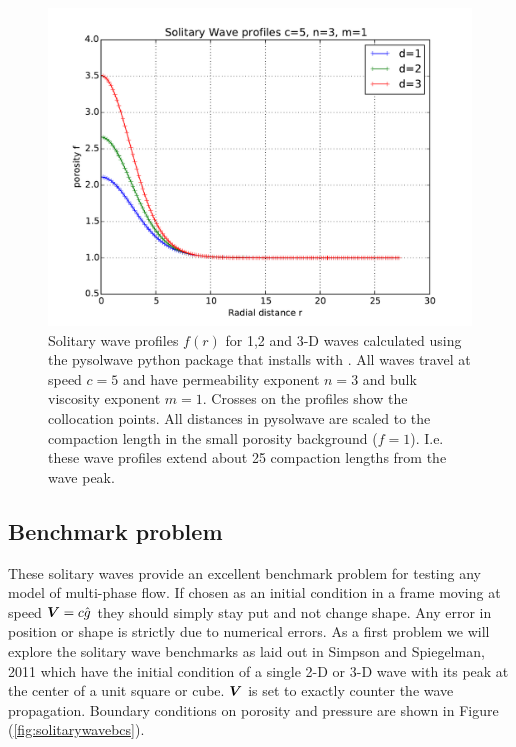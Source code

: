 \begin{figure}[htbp!]
  \centering
  \includegraphics[width=.75\textwidth]{figures/SolitaryWavesProfiles.pdf}
  \caption{Solitary wave profiles $f(r)$ for 1,2 and 3-D waves
    calculated using the pysolwave python package that installs with
    \TF.  All waves travel at speed $c=5$ and have permeability
    exponent $n=3$ and bulk viscosity exponent $m=1$.  Crosses on the
    profiles show the collocation points. All distances in pysolwave
    are scaled to the compaction length in the small porosity
    background ($f=1$).  I.e. these wave profiles extend about 25
    compaction lengths from the wave peak.}
\label{fig:SolitaryWaveProfiles}
 \end{figure}

\subsection{Benchmark problem}
\label{sec:benchmark-problem}

These solitary waves provide an excellent benchmark problem for
testing any model of multi-phase flow.  If chosen as an initial
condition in a frame moving at speed ${\mbox{\boldmath$V$}} = c\hat{g}$ they should
simply stay put and not change shape.  Any error in position or shape
is strictly due to numerical errors.  As a first problem we will
explore the solitary wave benchmarks as laid out in Simpson and
Spiegelman, 2011 \cite{simpson_solitary_2011} which have the initial
condition of  a single 2-D
or 3-D wave with its peak at the center of a unit square or cube.
${\mbox{\boldmath$V$}}$ is set to exactly counter the wave propagation.  Boundary
conditions on porosity and pressure are shown in Figure (\ref{fig:solitarywavebcs}). 


